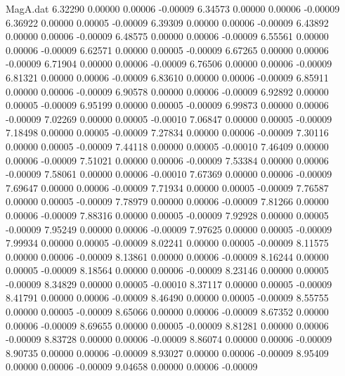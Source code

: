 \begin{filecontents}{MagA.dat}
   6.32290    0.00000    0.00006   -0.00009
   6.34573    0.00000    0.00006   -0.00009
   6.36922    0.00000    0.00005   -0.00009
   6.39309    0.00000    0.00006   -0.00009
   6.43892    0.00000    0.00006   -0.00009
   6.48575    0.00000    0.00006   -0.00009
   6.55561    0.00000    0.00006   -0.00009
   6.62571    0.00000    0.00005   -0.00009
   6.67265    0.00000    0.00006   -0.00009
   6.71904    0.00000    0.00006   -0.00009
   6.76506    0.00000    0.00006   -0.00009
   6.81321    0.00000    0.00006   -0.00009
   6.83610    0.00000    0.00006   -0.00009
   6.85911    0.00000    0.00006   -0.00009
   6.90578    0.00000    0.00006   -0.00009
   6.92892    0.00000    0.00005   -0.00009
   6.95199    0.00000    0.00005   -0.00009
   6.99873    0.00000    0.00006   -0.00009
   7.02269    0.00000    0.00005   -0.00010
   7.06847    0.00000    0.00005   -0.00009
   7.18498    0.00000    0.00005   -0.00009
   7.27834    0.00000    0.00006   -0.00009
   7.30116    0.00000    0.00005   -0.00009
   7.44118    0.00000    0.00005   -0.00010
   7.46409    0.00000    0.00006   -0.00009
   7.51021    0.00000    0.00006   -0.00009
   7.53384    0.00000    0.00006   -0.00009
   7.58061    0.00000    0.00006   -0.00010
   7.67369    0.00000    0.00006   -0.00009
   7.69647    0.00000    0.00006   -0.00009
   7.71934    0.00000    0.00005   -0.00009
   7.76587    0.00000    0.00005   -0.00009
   7.78979    0.00000    0.00006   -0.00009
   7.81266    0.00000    0.00006   -0.00009
   7.88316    0.00000    0.00005   -0.00009
   7.92928    0.00000    0.00005   -0.00009
   7.95249    0.00000    0.00006   -0.00009
   7.97625    0.00000    0.00005   -0.00009
   7.99934    0.00000    0.00005   -0.00009
   8.02241    0.00000    0.00005   -0.00009
   8.11575    0.00000    0.00006   -0.00009
   8.13861    0.00000    0.00006   -0.00009
   8.16244    0.00000    0.00005   -0.00009
   8.18564    0.00000    0.00006   -0.00009
   8.23146    0.00000    0.00005   -0.00009
   8.34829    0.00000    0.00005   -0.00010
   8.37117    0.00000    0.00005   -0.00009
   8.41791    0.00000    0.00006   -0.00009
   8.46490    0.00000    0.00005   -0.00009
   8.55755    0.00000    0.00005   -0.00009
   8.65066    0.00000    0.00006   -0.00009
   8.67352    0.00000    0.00006   -0.00009
   8.69655    0.00000    0.00005   -0.00009
   8.81281    0.00000    0.00006   -0.00009
   8.83728    0.00000    0.00006   -0.00009
   8.86074    0.00000    0.00006   -0.00009
   8.90735    0.00000    0.00006   -0.00009
   8.93027    0.00000    0.00006   -0.00009
   8.95409    0.00000    0.00006   -0.00009
   9.04658    0.00000    0.00006   -0.00009

\end{filecontents}
